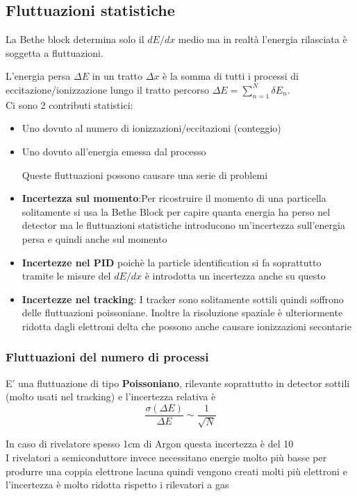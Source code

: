 \subsection*{Fluttuazioni statistiche}
La Bethe block determina solo il $dE/dx$ medio ma in realtà l'energia rilasciata è soggetta a fluttuazioni.

L'energia persa $\Delta E$ in un tratto $\Delta x$ è la somma di tutti i processi di eccitazione/ionizzazione lungo il tratto percorso $\Delta E= \sum^N_{n=1} \delta E_n$.\\
Ci sono 2 contributi statistici:
\begin{itemize}
    \item Uno dovuto al numero di ionizzazioni/eccitazioni (conteggio)
    \item Uno dovuto all'energia emessa dal processo
    
    Queste fluttuazioni possono causare una serie di problemi
    
    \item \textbf{Incertezza sul momento}:Per ricostruire il momento di una particella solitamente si usa la Bethe Block per capire quanta energia ha perso nel detector ma le fluttuazioni statistiche introducono un'incertezza sull'energia persa e quindi anche sul momento
    \item \textbf{Incertezze nel PID} poichè la particle identification si fa soprattutto tramite le misure del $dE/dx$ è introdotta un incertezza anche su questo
    \item \textbf{Incertezze nel tracking}: I tracker sono solitamente sottili quindi soffrono delle fluttuazioni poissoniane. Inoltre la risoluzione spaziale è ulteriormente ridotta dagli elettroni delta che possono anche causare ionizzazioni secontarie
    
\end{itemize}

\subsubsection*{Fluttuazioni del numero di processi}
E' una fluttuazione di tipo \textbf{Poissoniano}, rilevante soprattutto in detector sottili (molto usati nel tracking) e l'incertezza relativa è
\[\frac{\sigma(\Delta E)}{\Delta E}\sim\frac{1}{\sqrt{N}}\]

\begin{remark}

    In caso di rivelatore spesso 1cm di Argon questa incertezza è del 10%
\\
    I rivelatori a semiconduttore invece necessitano energie molto più basse per produrre una coppia elettrone lacuna quindi vengono creati molti più elettroni e l'incertezza è molto ridotta rispetto i rilevatori a gas

\end{remark}

